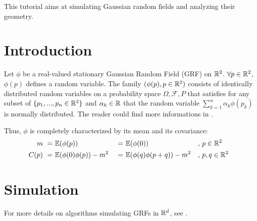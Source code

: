\def\difficulty{3}

\begin{note}This tutorial aims at simulating Gaussian random fields and analyzing their geometry.\end{note}

\section{Introduction}
Let $\phi$ be a real-valued stationary Gaussian Random Field (GRF) on ${\mathbb{R}}^2$. $\forall p\in{\mathbb{R}}^2$, $\phi(p)$ defines a random variable. The family $(\phi(p),p\in{\mathbb{R}}^2)$ consists of identically distributed random variables on a probability space $\Omega, \mathcal{F}, P$ that satisfies for any subset of $\{p_1,...,p_n \in {\mathbb{R}}^2\}$ and $\alpha_k\in{\mathbb{R}}$ that the random variable $\sum_{k=1}^n \alpha_k \phi(p_k)$ is normally distributed. The reader could find more informations in \cite{Worsley1997,Adler1981,Ahmad2013}.

Thus, $\phi$ is completely characterized by its mean and its covariance:
\begin{alignat}{4}
 m   \ =\ &{\mathbb{E}}(\phi(p)) &\ =\ & {\mathbb{E}}(\phi(0))                         &,\ & p\in{\mathbb{R}}^2 \\
 C(p)\ =\ &{\mathbb{E}}(\phi(0)\phi(p))-m^2 &\ =\ & {\mathbb{E}}(\phi(q)\phi(p+q))-m^2 &,\ & p,q \in {\mathbb{R}}^2
\end{alignat}




\section{Simulation}
For more details on algorithms simulating GRFs in ${\mathbb{R}}^d$, see \cite{Lang2011}.

